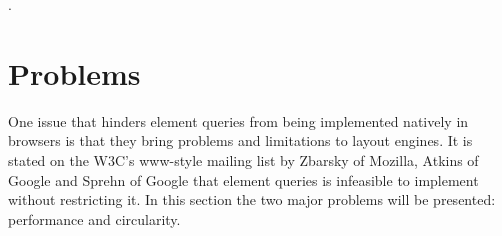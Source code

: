 \documentclass[a4paper,11pt]{kth-mag}
\begin{document}
      .

    \section{Problems}\label{sec:eq-problems}
      One issue that hinders element queries from being implemented natively in browsers is that they bring problems and limitations to layout engines.
      It is stated on the W3C's www-style mailing list \cite{w3c_eq_mail} by Zbarsky of Mozilla, Atkins of Google and Sprehn of Google that element queries is infeasible to implement without restricting it.
      In this section the two major problems will be presented: performance and circularity.
\end{document}
